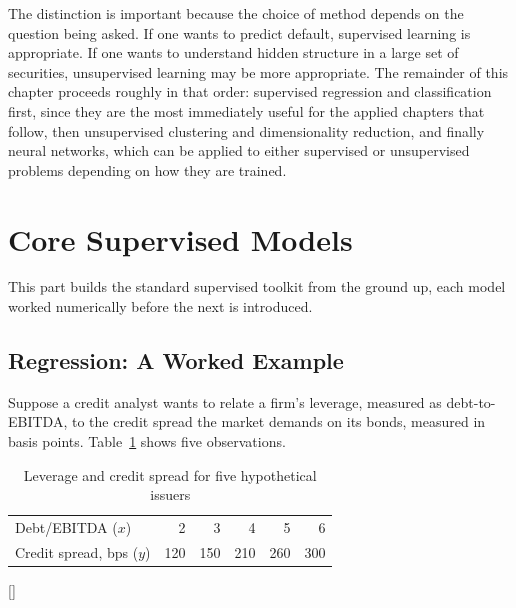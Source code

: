 \documentclass[../ai_in_finance]{subfiles}
\begin{document}
The distinction is important because the choice of method depends on the question being asked. If one wants to predict default, supervised learning is appropriate. If one wants to understand hidden structure in a large set of securities, unsupervised learning may be more appropriate. The remainder of this chapter proceeds roughly in that order: supervised regression and classification first, since they are the most immediately useful for the applied chapters that follow, then unsupervised clustering and dimensionality reduction, and finally neural networks, which can be applied to either supervised or unsupervised problems depending on how they are trained.

\section{Core Supervised Models}

This part builds the standard supervised toolkit from the ground up, each model worked numerically before the next is introduced.

\subsection{Regression: A Worked Example}
\label{sec:regression-example}

Suppose a credit analyst wants to relate a firm's leverage, measured as debt-to-EBITDA, to the credit spread the market demands on its bonds, measured in basis points. Table~\ref{tab:credit_spread_data} shows five observations.

\begin{table}[htbp]
\centering
\begin{lrbox}{\bookmeasuredbox}
\begin{tabular}{lrrrrr}
\toprule
Debt/EBITDA ($x$) & 2 & 3 & 4 & 5 & 6 \\
Credit spread, bps ($y$) & 120 & 150 & 210 & 260 & 300 \\
\bottomrule
\end{tabular}
\end{lrbox}
\ifdim\wd\bookmeasuredbox<0.65\linewidth
\setlength{\bookcapwidth}{0.65\linewidth}
\else
\setlength{\bookcapwidth}{\wd\bookmeasuredbox}
\fi
{}[\bookcapwidth]{
\usebox{\bookmeasuredbox}
}{
\caption{Leverage and credit spread for five hypothetical issuers}
\label{tab:credit_spread_data}
}
\end{table}
\end{document}
